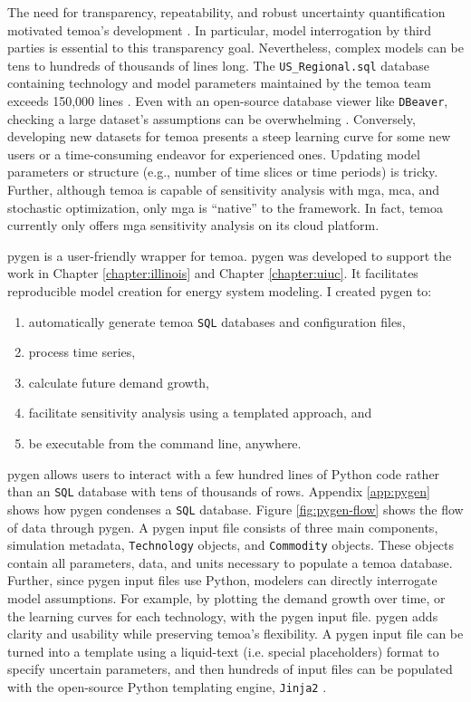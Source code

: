 The need for transparency, repeatability, and robust uncertainty quantification
motivated \gls{temoa}'s development \cite{hunter_modeling_2013}.
In particular, model interrogation by third parties is essential to this transparency
goal. Nevertheless, complex models can be tens to hundreds of thousands of lines long.
The \texttt{US\_Regional.sql} database containing technology and model parameters
maintained by the \gls{temoa} team exceeds
150,000 lines \cite{model_databases_2021}. Even with an open-source
database viewer like \texttt{DBeaver}, checking a large dataset's assumptions can be
overwhelming \cite{noauthor_dbeaver_nodate}. Conversely, developing new datasets
for \gls{temoa} presents a steep learning curve for some new users or a time-consuming
endeavor for experienced ones. Updating model parameters or structure (e.g., number
of time slices or time periods) is tricky. Further, although \gls{temoa}
is capable of sensitivity analysis with \gls{mga}, \gls{mca}, and stochastic
optimization, only \gls{mga} is ``native'' to the framework. In fact, \gls{temoa}
currently only offers \gls{mga} sensitivity analysis on its cloud platform.

\gls{pygen} is a user-friendly wrapper for \gls{temoa}. \gls{pygen} was developed
to support the work in Chapter \ref{chapter:illinois} and Chapter \ref{chapter:uiuc}.
It facilitates reproducible model creation for energy system modeling.
I created \gls{pygen} to:
\begin{enumerate}
  \item automatically generate \gls{temoa} \texttt{SQL} databases and configuration files,
  \item process time series,
  \item calculate future demand growth,
  \item facilitate sensitivity analysis using a templated approach, and
  \item be executable from the command line, anywhere.
\end{enumerate}
\gls{pygen} allows users to interact with a few hundred lines of Python code rather
than an \texttt{SQL} database with tens of thousands of rows. Appendix \ref{app:pygen}
shows how \gls{pygen} condenses a \texttt{SQL} database.
Figure \ref{fig:pygen-flow} shows the flow of data through \gls{pygen}.
A \gls{pygen} input file consists of three main components, simulation metadata,
\texttt{Technology} objects, and \texttt{Commodity} objects. These objects
contain all parameters, data, and units necessary to populate a \gls{temoa}
database. Further, since \gls{pygen} input files use Python, modelers
can directly interrogate model assumptions. For example, by plotting the demand
growth over time, or the learning curves for each technology, with the \gls{pygen}
input file.
\gls{pygen} adds clarity and usability while preserving \gls{temoa}'s flexibility.
A \gls{pygen} input file can be turned into a template using a liquid-text (i.e.
special placeholders) format to specify uncertain parameters, and then hundreds
of input files can be populated with the open-source Python templating engine,
\texttt{Jinja2} \cite{noauthor_jinja_2022}.

